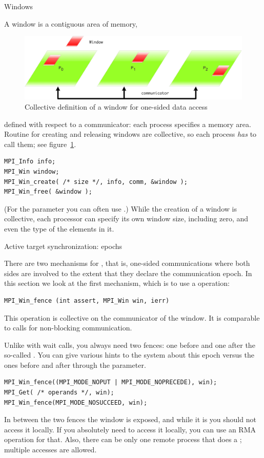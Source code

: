 
 {Windows}

A window is a contiguous area of memory,
\begin{figure}[ht]
  \includegraphics[scale=.1]{graphics-public/one-sided-window}
  \caption{Collective definition of a window for one-sided data access}
  \label{fig:window}
\end{figure}
defined with respect to a communicator: each process specifies a
memory area. Routine for creating and releasing windows
are collective, so each process \emph{has} to
call them; see figure~\ref{fig:window}. 
\begin{verbatim}
MPI_Info info;
MPI_Win window;
MPI_Win_create( /* size */, info, comm, &window );
MPI_Win_free( &window );
\end{verbatim}
(For the  parameter you can often use .)
While the creation of a window is collective, each
processor can specify its own window size, including zero, and even the type of the
elements in it.

 {Active target synchronization: epochs}

There are two mechanisms for , that is,
one-sided communications where both sides are involved to the extent that they declare
the communication epoch. In this section we look at the first mechanism,
which is to use a  operation:
\begin{verbatim}
MPI_Win_fence (int assert, MPI_Win win, ierr)
\end{verbatim}
This operation is collective on the communicator of the window.
It is comparable to  calls for non-blocking communication.

Unlike with wait calls, you always need two fences: one before and one after
the so-called . 
You can give various hints to the system about this epoch versus the ones
before and after through the  parameter.
\begin{verbatim}
MPI_Win_fence((MPI_MODE_NOPUT | MPI_MODE_NOPRECEDE), win);
MPI_Get( /* operands */, win);
MPI_Win_fence(MPI_MODE_NOSUCCEED, win);
\end{verbatim}
In between the two fences the window is exposed, and while it is you
should not access it locally. If you absolutely need to access it
locally, you can use an \ac{RMA} operation for that. Also, there can be only one
remote process that does a ; multiple  accesses are allowed.

